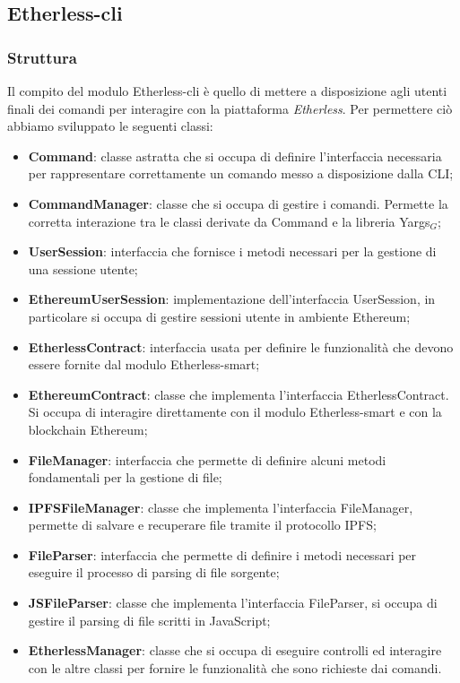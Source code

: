 \subsection{Etherless-cli}
\subsubsection{Struttura}
Il compito del modulo Etherless-cli è quello di mettere a disposizione agli utenti finali dei comandi per interagire con la piattaforma \textit{Etherless}. Per permettere ciò abbiamo sviluppato le seguenti classi:
\begin{itemize}
	\item \textbf{Command}: classe astratta che si occupa di definire l'interfaccia necessaria per rappresentare correttamente un comando messo a disposizione dalla CLI;
	\item \textbf{CommandManager}: classe che si occupa di gestire i comandi. Permette la corretta interazione tra le classi derivate da Command e la libreria Yargs$_{G}$;
	\item \textbf{UserSession}: interfaccia che fornisce i metodi necessari per la gestione di una sessione utente;
	\item \textbf{EthereumUserSession}: implementazione dell'interfaccia UserSession, in particolare si occupa di gestire sessioni utente in ambiente Ethereum;
	\item \textbf{EtherlessContract}: interfaccia usata per definire le funzionalità che devono essere fornite dal modulo Etherless-smart;
	\item \textbf{EthereumContract}: classe che implementa l'interfaccia EtherlessContract. Si occupa di interagire direttamente con il modulo Etherless-smart e con la blockchain Ethereum;
	\item \textbf{FileManager}: interfaccia che permette di definire alcuni metodi fondamentali per la gestione di file;
	\item \textbf{IPFSFileManager}: classe che implementa l'interfaccia FileManager, permette di salvare e recuperare file tramite il protocollo IPFS;
	\item \textbf{FileParser}: interfaccia che permette di definire i metodi necessari per eseguire il processo di parsing di file sorgente;
	\item \textbf{JSFileParser}: classe che implementa l'interfaccia FileParser, si occupa di gestire il parsing di file scritti in JavaScript;
	\item \textbf{EtherlessManager}: classe che si occupa di eseguire controlli ed interagire con le altre classi per fornire le funzionalità che sono richieste dai comandi.
\end{itemize}

